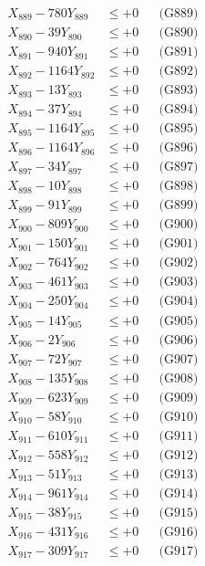 \documentclass[a4paper,10pt]{article}
\begin{document}
{\begin{align}
X_{889} - 780Y_{889} &\leq +0 && \text{(G889)} \\
X_{890} - 39Y_{890} &\leq +0 && \text{(G890)} \\
\allowbreak
X_{891} - 940Y_{891} &\leq +0 && \text{(G891)} \\
X_{892} - 1164Y_{892} &\leq +0 && \text{(G892)} \\
X_{893} - 13Y_{893} &\leq +0 && \text{(G893)} \\
X_{894} - 37Y_{894} &\leq +0 && \text{(G894)} \\
X_{895} - 1164Y_{895} &\leq +0 && \text{(G895)} \\
X_{896} - 1164Y_{896} &\leq +0 && \text{(G896)} \\
X_{897} - 34Y_{897} &\leq +0 && \text{(G897)} \\
X_{898} - 10Y_{898} &\leq +0 && \text{(G898)} \\
X_{899} - 91Y_{899} &\leq +0 && \text{(G899)} \\
X_{900} - 809Y_{900} &\leq +0 && \text{(G900)} \\
\allowbreak
X_{901} - 150Y_{901} &\leq +0 && \text{(G901)} \\
X_{902} - 764Y_{902} &\leq +0 && \text{(G902)} \\
X_{903} - 461Y_{903} &\leq +0 && \text{(G903)} \\
X_{904} - 250Y_{904} &\leq +0 && \text{(G904)} \\
X_{905} - 14Y_{905} &\leq +0 && \text{(G905)} \\
X_{906} - 2Y_{906} &\leq +0 && \text{(G906)} \\
X_{907} - 72Y_{907} &\leq +0 && \text{(G907)} \\
X_{908} - 135Y_{908} &\leq +0 && \text{(G908)} \\
X_{909} - 623Y_{909} &\leq +0 && \text{(G909)} \\
X_{910} - 58Y_{910} &\leq +0 && \text{(G910)} \\
\allowbreak
X_{911} - 610Y_{911} &\leq +0 && \text{(G911)} \\
X_{912} - 558Y_{912} &\leq +0 && \text{(G912)} \\
X_{913} - 51Y_{913} &\leq +0 && \text{(G913)} \\
X_{914} - 961Y_{914} &\leq +0 && \text{(G914)} \\
X_{915} - 38Y_{915} &\leq +0 && \text{(G915)} \\
X_{916} - 431Y_{916} &\leq +0 && \text{(G916)} \\
X_{917} - 309Y_{917} &\leq +0 && \text{(G917)} \\

\end{align}}
\end{document}
